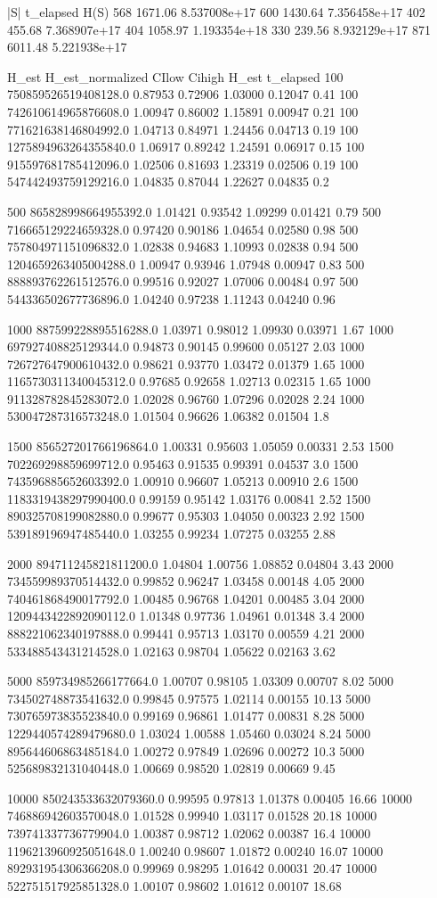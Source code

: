 |S|	t_elapsed	H(S)					
568	1671.06	8.537008e+17					
600	1430.64	7.356458e+17					
402	455.68	7.368907e+17					
404	1058.97	1.193354e+18					
330	239.56	8.932129e+17					
871	6011.48	5.221938e+17					
													
							
		H_est	H_est_normalized	CIlow	Cihigh	H_est	t_elapsed
	100	750859526519408128.0	0.87953	0.72906	1.03000	0.12047	0.41
	100	742610614965876608.0	1.00947	0.86002	1.15891	0.00947	0.21
	100	771621638146804992.0	1.04713	0.84971	1.24456	0.04713	0.19
	100	1275894963264355840.0	1.06917	0.89242	1.24591	0.06917	0.15
	100	915597681785412096.0	1.02506	0.81693	1.23319	0.02506	0.19
	100	547442493759129216.0	1.04835	0.87044	1.22627	0.04835	0.2
							
	500	865828998664955392.0	1.01421	0.93542	1.09299	0.01421	0.79
	500	716665129224659328.0	0.97420	0.90186	1.04654	0.02580	0.98
	500	757804971151096832.0	1.02838	0.94683	1.10993	0.02838	0.94
	500	1204659263405004288.0	1.00947	0.93946	1.07948	0.00947	0.83
	500	888893762261512576.0	0.99516	0.92027	1.07006	0.00484	0.97
	500	544336502677736896.0	1.04240	0.97238	1.11243	0.04240	0.96
							
	1000	887599228895516288.0	1.03971	0.98012	1.09930	0.03971	1.67
	1000	697927408825129344.0	0.94873	0.90145	0.99600	0.05127	2.03
	1000	726727647900610432.0	0.98621	0.93770	1.03472	0.01379	1.65
	1000	1165730311340045312.0	0.97685	0.92658	1.02713	0.02315	1.65
	1000	911328782845283072.0	1.02028	0.96760	1.07296	0.02028	2.24
	1000	530047287316573248.0	1.01504	0.96626	1.06382	0.01504	1.8
							
	1500	856527201766196864.0	1.00331	0.95603	1.05059	0.00331	2.53
	1500	702269298859699712.0	0.95463	0.91535	0.99391	0.04537	3.0
	1500	743596885652603392.0	1.00910	0.96607	1.05213	0.00910	2.6
	1500	1183319438297990400.0	0.99159	0.95142	1.03176	0.00841	2.52
	1500	890325708199082880.0	0.99677	0.95303	1.04050	0.00323	2.92
	1500	539189196947485440.0	1.03255	0.99234	1.07275	0.03255	2.88
							
	2000	894711245821811200.0	1.04804	1.00756	1.08852	0.04804	3.43
	2000	734559989370514432.0	0.99852	0.96247	1.03458	0.00148	4.05
	2000	740461868490017792.0	1.00485	0.96768	1.04201	0.00485	3.04
	2000	1209443422892090112.0	1.01348	0.97736	1.04961	0.01348	3.4
	2000	888221062340197888.0	0.99441	0.95713	1.03170	0.00559	4.21
	2000	533488543431214528.0	1.02163	0.98704	1.05622	0.02163	3.62
							
	5000	859734985266177664.0	1.00707	0.98105	1.03309	0.00707	8.02
	5000	734502748873541632.0	0.99845	0.97575	1.02114	0.00155	10.13
	5000	730765973835523840.0	0.99169	0.96861	1.01477	0.00831	8.28
	5000	1229440574289479680.0	1.03024	1.00588	1.05460	0.03024	8.24
	5000	895644606863485184.0	1.00272	0.97849	1.02696	0.00272	10.3
	5000	525689832131040448.0	1.00669	0.98520	1.02819	0.00669	9.45
							
	10000	850243533632079360.0	0.99595	0.97813	1.01378	0.00405	16.66
	10000	746886942603570048.0	1.01528	0.99940	1.03117	0.01528	20.18
	10000	739741337736779904.0	1.00387	0.98712	1.02062	0.00387	16.4
	10000	1196213960925051648.0	1.00240	0.98607	1.01872	0.00240	16.07
	10000	892931954306366208.0	0.99969	0.98295	1.01642	0.00031	20.47
	10000	522751517925851328.0	1.00107	0.98602	1.01612	0.00107	18.68